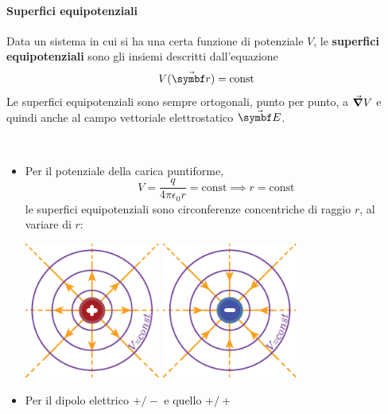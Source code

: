 \paragraph{Superfici equipotenziali}
\begin{define}
	Data un sistema in cui si ha una certa funzione di potenziale $V$, le \textbf{superfici equipotenziali} sono gli insiemi descritti dall'equazione
	\begin{equation}
		V(\vba{r})=\textrm{const}
	\end{equation}
	Le superfici equipotenziali sono sempre ortogonali, punto per punto, a $\grad{V}$ e quindi anche al campo vettoriale elettrostatico $\vba{E}$.
\end{define}
\begin{examples}~{}
	\begin{itemize}
		\item Per il potenziale della carica puntiforme,
		\begin{equation*}
			V=\frac{q}{4\pi\epsilon_0r}=\mathrm{const}\implies r=\mathrm{const}
		\end{equation*}
		le superfici equipotenziali sono circonferenze concentriche di raggio $r$, al variare di $r$:
		\begin{center}
			\includegraphics[width=0.35\textwidth]{images/chp3/chp3potcampocoulomb1.pdf}\hspace{20pt}
			\includegraphics[width=0.35\textwidth]{images/chp3/chp3potcampocoulomb2.pdf}
		\end{center}
		\item Per il dipolo elettrico $+/-$ e quello $+/+$

\end{itemize}
\end{examples}
